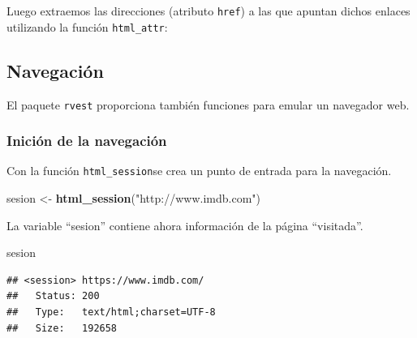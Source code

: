\documentclass[]{article}
\newenvironment{Shaded}{\begin{snugshade}}{\end{snugshade}}
\newcommand{\KeywordTok}[1]{\textcolor[rgb]{0.13,0.29,0.53}{\textbf{#1}}}
\newcommand{\DataTypeTok}[1]{\textcolor[rgb]{0.13,0.29,0.53}{#1}}
\newcommand{\DecValTok}[1]{\textcolor[rgb]{0.00,0.00,0.81}{#1}}
\newcommand{\StringTok}[1]{\textcolor[rgb]{0.31,0.60,0.02}{#1}}
\newcommand{\CommentTok}[1]{\textcolor[rgb]{0.56,0.35,0.01}{\textit{#1}}}
\newcommand{\OperatorTok}[1]{\textcolor[rgb]{0.81,0.36,0.00}{\textbf{#1}}}
\newcommand{\NormalTok}[1]{#1}
\begin{document}
Luego extraemos las direcciones (atributo \texttt{href}) a las que
apuntan dichos enlaces utilizando la función \texttt{html\_attr}:

\begin{Shaded}
\end{Shaded}

\subsection{Navegación}\label{navegacion}

El paquete \texttt{rvest} proporciona también funciones para emular un
navegador web.

\subsubsection{Inición de la navegación}\label{inicion-de-la-navegacion}

Con la función \texttt{html\_session}se crea un punto de entrada para la
navegación.

\begin{Shaded}
\begin{Highlighting}[]
\NormalTok{sesion <-}\StringTok{ }\KeywordTok{html_session}\NormalTok{(}\StringTok{"http://www.imdb.com"}\NormalTok{)}
\end{Highlighting}
\end{Shaded}

La variable ``sesion'' contiene ahora información de la página
``visitada''.

\begin{Shaded}
\begin{Highlighting}[]
\NormalTok{sesion }
\end{Highlighting}
\end{Shaded}

\begin{verbatim}
## <session> https://www.imdb.com/
##   Status: 200
##   Type:   text/html;charset=UTF-8
##   Size:   192658
\end{verbatim}
\end{document}
